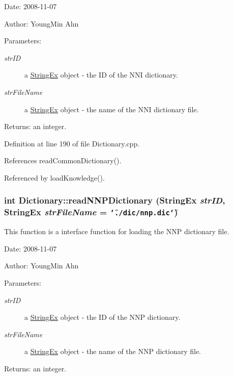 \begin{Desc}
\item[Date:]2008-11-07 \end{Desc}
\begin{Desc}
\item[Author:]YoungMin Ahn \end{Desc}
\begin{Desc}
\item[Parameters:]
\begin{description}
\item[{\em strID}]a \hyperlink{classStringEx}{StringEx} object - the ID of the NNI dictionary. \item[{\em strFileName}]a \hyperlink{classStringEx}{StringEx} object - the name of the NNI dictionary file. \end{description}
\end{Desc}
\begin{Desc}
\item[Returns:]an integer. \end{Desc}


Definition at line 190 of file Dictionary.cpp.

References readCommonDictionary().

Referenced by loadKnowledge().\hypertarget{classkmaOrange_1_1Dictionary_f233eb7cf842535ade20e4bb4b58ce1a}{
\subsubsection[{readNNPDictionary}]{\setlength{\rightskip}{0pt plus 5cm}int Dictionary::readNNPDictionary ({\bf StringEx} {\em strID}, \/  {\bf StringEx} {\em strFileName} = {\tt \char`\"{}./dic/nnp.dic\char`\"{}})}}
\label{classkmaOrange_1_1Dictionary_f233eb7cf842535ade20e4bb4b58ce1a}


This function is a interface function for loading the NNP dictionary file. 

\begin{Desc}
\item[Date:]2008-11-07 \end{Desc}
\begin{Desc}
\item[Author:]YoungMin Ahn \end{Desc}
\begin{Desc}
\item[Parameters:]
\begin{description}
\item[{\em strID}]a \hyperlink{classStringEx}{StringEx} object - the ID of the NNP dictionary. \item[{\em strFileName}]a \hyperlink{classStringEx}{StringEx} object - the name of the NNP dictionary file. \end{description}
\end{Desc}
\begin{Desc}
\item[Returns:]an integer. \end{Desc}


